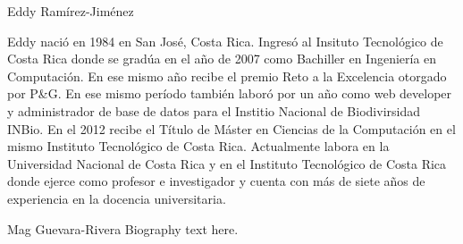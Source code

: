 \documentclass[12pt,journal,compsoc]{IEEEtran}
\begin{document}
\begin{IEEEbiography}{Eddy Ram\'irez-Jim\'enez}

Eddy naci\'o en 1984 en San Jos\'e, Costa Rica. Ingresó al Insituto Tecnológico de Costa Rica donde se grad\'ua en el a\~no de 2007 como Bachiller en Ingenier\'ia en Computaci\'on. En ese mismo a\~no recibe el premio Reto a la Excelencia otorgado por P\&G. En ese mismo per\'iodo tambi\'en labor\'o por un a\~no como web developer y administrador de base de datos para el Institio Nacional de Biodivirsidad INBio. En el 2012 recibe el Título de M\'aster en Ciencias de la Computaci\'on en el mismo Instituto Tecnol\'ogico de Costa Rica.
Actualmente labora en la Universidad Nacional de Costa Rica y en el Instituto Tecnol\'ogico de Costa Rica donde ejerce como profesor e investigador y cuenta con m\'as de siete a\~nos de experiencia en la docencia universitaria. 

\end{IEEEbiography}

\begin{IEEEbiography}{Mag Guevara-Rivera}
Biography text here.
\end{IEEEbiography}







\end{document}
